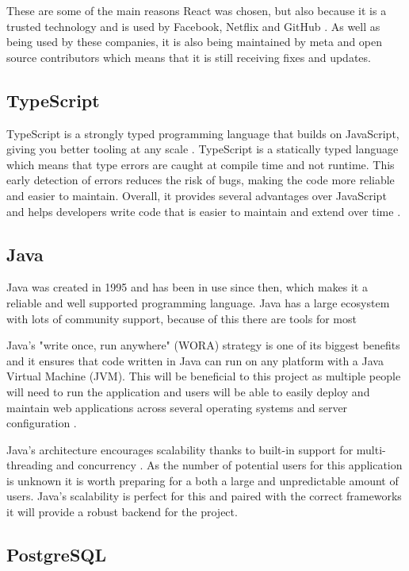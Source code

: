 \documentclass[]{project_report}
\begin{document}
These are some of the main reasons React was chosen, but also because it is a trusted technology and is used by Facebook, Netflix and GitHub \cite{react_stats}. As well as being used by these companies, it is also being maintained by meta and open source contributors which means that it is still receiving fixes and updates.

\subsection{TypeScript}

TypeScript is a strongly typed programming language that builds on JavaScript, giving you better tooling at any scale \cite{typescript}. TypeScript is a statically typed language which means that type errors are caught at compile time and not runtime. This early detection of errors reduces the risk of bugs, making the code more reliable and easier to maintain. Overall, it provides several advantages over JavaScript \cite{javascript_alternatives} and helps developers write code that is easier to maintain and extend over time \cite{javascript_alternatives}.

\subsection{Java}

Java was created in 1995 and has been in use since then, which makes it a reliable and well supported programming language. Java has a large ecosystem with lots of community support, because of this there are tools for most

Java’s "write once, run anywhere" (WORA) strategy is one of its biggest benefits and it ensures that code written in Java can run on any platform with a Java Virtual Machine (JVM). This will be beneficial to this project as multiple people will need to run the application and users will be able to easily deploy and maintain web applications across several operating systems and server configuration \cite{java}. 

Java's architecture encourages scalability thanks to built-in support for multi-threading and concurrency \cite{java}. As the number of potential users for this application is unknown it is worth preparing for a both a large and unpredictable amount of users. Java's scalability is perfect for this and paired with the correct frameworks it will provide a robust backend for the project.

\subsection{PostgreSQL}
\end{document}
